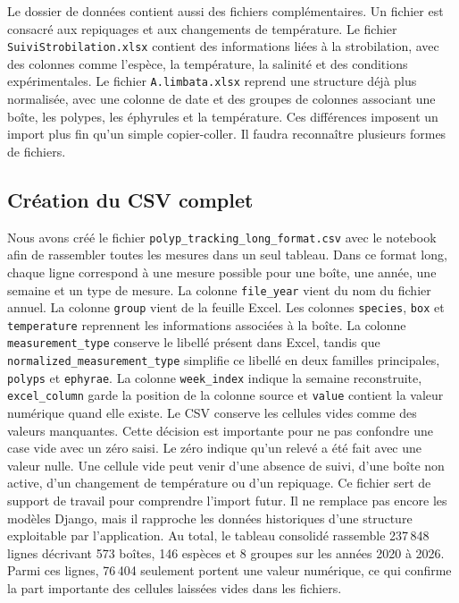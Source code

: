 \documentclass{article}
\begin{document}
Le dossier de données contient aussi des fichiers complémentaires. Un fichier est consacré aux repiquages et aux changements de température. Le fichier \texttt{SuiviStrobilation.xlsx} contient des informations liées à la strobilation, avec des colonnes comme l’espèce, la température, la salinité et des conditions expérimentales. Le fichier \texttt{A.limbata.xlsx} reprend une structure déjà plus normalisée, avec une colonne de date et des groupes de colonnes associant une boîte, les polypes, les éphyrules et la température. Ces différences imposent un import plus fin qu’un simple copier-coller. Il faudra reconnaître plusieurs formes de fichiers.

\subsection{Création du CSV complet}

Nous avons créé le fichier \texttt{polyp\_tracking\_long\_format.csv} avec le notebook afin de rassembler toutes les mesures dans un seul tableau. Dans ce format long, chaque ligne correspond à une mesure possible pour une boîte, une année, une semaine et un type de mesure. La colonne \texttt{file\_year} vient du nom du fichier annuel. La colonne \texttt{group} vient de la feuille Excel. Les colonnes \texttt{species}, \texttt{box} et \texttt{temperature} reprennent les informations associées à la boîte. La colonne \texttt{measurement\_type} conserve le libellé présent dans Excel, tandis que \texttt{normalized\_measurement\_type} simplifie ce libellé en deux familles principales, \texttt{polyps} et \texttt{ephyrae}. La colonne \texttt{week\_index} indique la semaine reconstruite, \texttt{excel\_column} garde la position de la colonne source et \texttt{value} contient la valeur numérique quand elle existe.
Le CSV conserve les cellules vides comme des valeurs manquantes. Cette décision est importante pour ne pas confondre une case vide avec un zéro saisi. 
Le zéro indique qu’un relevé a été fait avec une valeur nulle. Une cellule vide peut venir d’une absence de suivi, d’une boîte non active, d’un changement de température ou d’un repiquage. Ce fichier sert de support de travail pour comprendre l’import futur. Il ne remplace pas encore les modèles Django, mais il rapproche les données historiques d’une structure exploitable par l’application. 
Au total, le tableau consolidé rassemble 237\,848 lignes décrivant 573 boîtes, 146 espèces et 8 groupes sur les années 2020 à 2026. Parmi ces lignes, 76\,404 seulement portent une valeur numérique, ce qui confirme la part importante des cellules laissées vides dans les fichiers.
\end{document}
